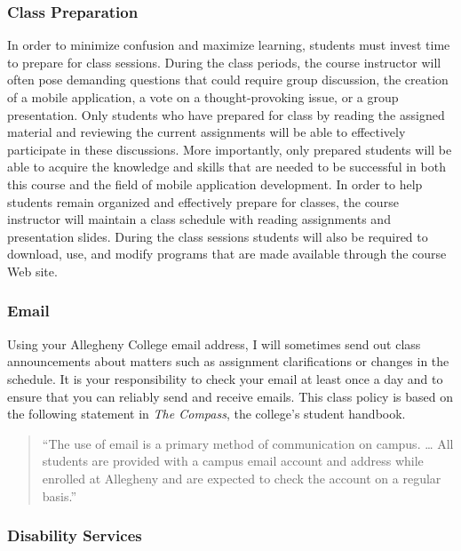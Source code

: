 \subsubsection*{Class Preparation}

In order to minimize confusion and maximize learning, students must invest time to prepare for class sessions.  During
the class periods, the course instructor will often pose demanding questions that could require group discussion, the
creation of a mobile application, a vote on a thought-provoking issue, or a group presentation.  Only students who have
prepared for class by reading the assigned material and reviewing the current assignments will be able to effectively
participate in these discussions.  More importantly, only prepared students will be able to acquire the knowledge and
skills that are needed to be successful in both this course and the field of mobile application development.  In order to help
students remain organized and effectively prepare for classes, the course instructor will maintain a class schedule with
reading assignments and presentation slides.   During the class sessions students will also be required to download,
use, and modify programs that are made available through the course Web site.

\subsubsection*{Email}

Using your Allegheny College email address, I will sometimes send out class announcements about matters such as
assignment clarifications or changes in the schedule. It is your responsibility to check your email at least once a day
and to ensure that you can reliably send and receive emails. This class policy is based on the following statement in
{\em The Compass}, the college's student handbook.

\vspace*{-.1in}
\begin{quote}
``The use of email is a primary method of communication on campus. \ldots
All students are provided with a campus email account and address while
enrolled at Allegheny and are expected to check the account on a regular
basis.'' 
\end{quote}
\vspace*{-.15in}

\subsubsection*{Disability Services}

